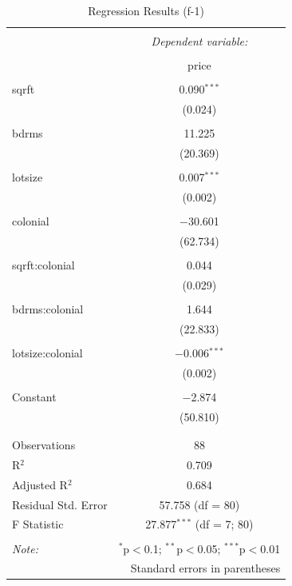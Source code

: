 \documentclass[
  12pt,
  landscape]{article}
\begin{document}
\begin{table}[H] \centering 
  \caption{Regression Results (f-1)} 
  \label{} 
\begin{tabular}{@{\extracolsep{5pt}}lc} 
\\[-1.8ex]\hline 
\hline \\[-1.8ex] 
 & \multicolumn{1}{c}{\textit{Dependent variable:}} \\ 
\cline{2-2} 
\\[-1.8ex] & price \\ 
\hline \\[-1.8ex] 
 sqrft & 0.090$^{***}$ \\ 
  & (0.024) \\ 
  & \\ 
 bdrms & 11.225 \\ 
  & (20.369) \\ 
  & \\ 
 lotsize & 0.007$^{***}$ \\ 
  & (0.002) \\ 
  & \\ 
 colonial & $-$30.601 \\ 
  & (62.734) \\ 
  & \\ 
 sqrft:colonial & 0.044 \\ 
  & (0.029) \\ 
  & \\ 
 bdrms:colonial & 1.644 \\ 
  & (22.833) \\ 
  & \\ 
 lotsize:colonial & $-$0.006$^{***}$ \\ 
  & (0.002) \\ 
  & \\ 
 Constant & $-$2.874 \\ 
  & (50.810) \\ 
  & \\ 
\hline \\[-1.8ex] 
Observations & 88 \\ 
R$^{2}$ & 0.709 \\ 
Adjusted R$^{2}$ & 0.684 \\ 
Residual Std. Error & 57.758 (df = 80) \\ 
F Statistic & 27.877$^{***}$ (df = 7; 80) \\ 
\hline 
\hline \\[-1.8ex] 
\textit{Note:}  & \multicolumn{1}{r}{$^{*}$p$<$0.1; $^{**}$p$<$0.05; $^{***}$p$<$0.01} \\ 
 & \multicolumn{1}{r}{Standard errors in parentheses} \\ 
\end{tabular} 
\end{table}
\end{document}
